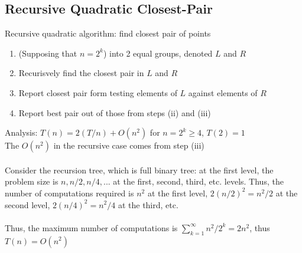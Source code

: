 \documentclass{article}
\begin{document}
		\subsection{Recursive Quadratic Closest-Pair}
			Recursive quadratic algorithm: find closest pair of points
			\begin{enumerate}[i]
				\item (Supposing that $n = 2^k$) into 2 equal groups, denoted $L$ and $R$
				\item Recurisvely find the closest pair in $L$ and $R$
				\item Report closest pair form testing elements of $L$ against elements of $R$
				\item Report best pair out of those from steps (ii) and (iii)
				\end{enumerate}
			Analysis: $T(n) = 2(T/n) + O(n^2)$ for $n = 2^k \geq 4$, $T(2) = 1$ \\
			The $O(n^2)$ in the recursive case comes from step (iii) \\
			\\
			Consider the recursion tree, which is full binary tree: at the first level, the problem size is $n, n/2, n/4, ...$ at the first, second, third, etc. levels. Thus, the number of computations required is $n^2$ at the first level, $2(n/2)^2 = n^2/2$ at the second level, $2(n/4)^2 = n^2/4$ at the third, etc. \\
			\\
			Thus, the maximum number of computations is $\sum_{k = 1}^\infty n^2/2^k = 2n^2$, thus $T(n) = O(n^2)$
\end{document}
